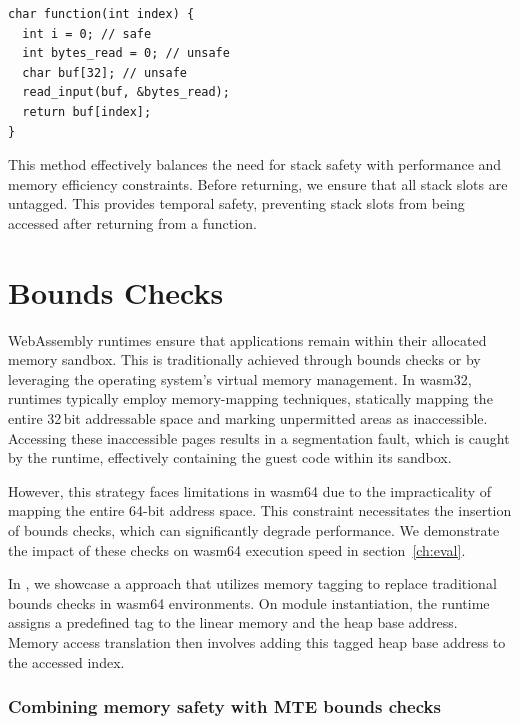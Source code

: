 \begin{lstlisting}[frame=h,style=customc,
    label={code:stack-safety}]
char function(int index) {
  int i = 0; // safe
  int bytes_read = 0; // unsafe
  char buf[32]; // unsafe
  read_input(buf, &bytes_read);
  return buf[index];
}
\end{lstlisting}

\noindent
This method effectively balances the need for stack safety with performance and memory efficiency constraints.
Before returning, we ensure that all stack slots are untagged.
This provides temporal safety, preventing stack slots from being accessed after returning from a function.

\section{Bounds Checks}
\label{sec:bounds-checks}

WebAssembly runtimes ensure that applications remain within their allocated memory sandbox.
This is traditionally achieved through bounds checks or by leveraging the operating system's virtual memory management.
In wasm32, runtimes typically employ memory-mapping techniques, statically mapping the entire 32\,bit addressable space and marking unpermitted areas as inaccessible.
Accessing these inaccessible pages results in a segmentation fault, which is caught by the runtime, effectively containing the guest code within its sandbox.

However, this strategy faces limitations in wasm64 due to the impracticality of mapping the entire 64-bit address space.
This constraint necessitates the insertion of bounds checks, which can significantly degrade performance.
We demonstrate the impact of these checks on wasm64 execution speed in section~\ref{ch:eval}.

In , we showcase a approach that utilizes memory tagging to replace traditional bounds checks in wasm64 environments.
On module instantiation, the runtime assigns a predefined tag to the linear memory and the heap base address.
Memory access translation then involves adding this tagged heap base address to the accessed index.

\subsubsection{Combining memory safety with MTE bounds checks}


